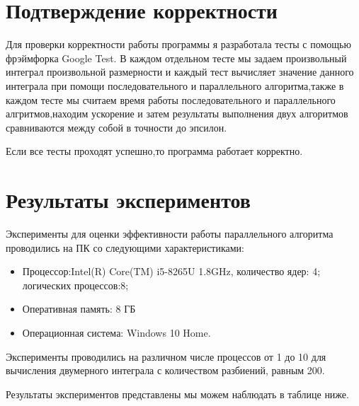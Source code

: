 \documentclass{report}
\begin{document}
\section*{Подтверждение корректности}
 Для проверки корректности работы программы я разработала  тесты с помощью фрэймфорка Google Test. В каждом отдельном тесте мы задаем произвольный интеграл произвольной размерности и каждый тест вычисляет значение данного интеграла при помощи последовательного и параллельного алгоритма,также в каждом тесте мы считаем время работы последовательного и параллельного алгритмов,находим ускорение и затем результаты выполнения двух алгоритмов сравниваются  между собой в точности до эпсилон.

\par Если все тесты проходят успешно,то программа работает корректно.
\newpage

\section*{Результаты экспериментов}
Эксперименты для оценки эффективности работы параллельного алгоритма проводились на ПК со следующими характеристиками:
\begin{itemize}
\item Процессор:Intel(R) Core(TM) i5-8265U 1.8GHz, количество ядер: 4; логических процессов:8;
\item Оперативная память: 8 ГБ
\item Операционная система: Windows 10 Home.
\end{itemize}

\par Эксперименты проводились на различном числе процессов от 1 до 10 для вычисления двумерного  интеграла  с количеством разбиений, равным 200. 
\par Результаты экспериментов представлены мы можем наблюдать в таблице ниже.
\end{document}
